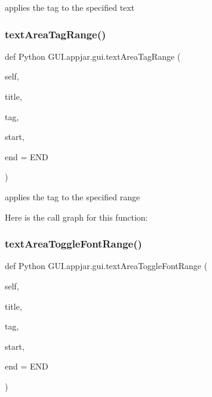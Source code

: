 \begin{DoxyVerb}
\begin{DoxyVerb}applies the tag to the specified text \end{DoxyVerb}
 \mbox{\label{class_python_01_g_u_i_1_1appjar_1_1gui_a6e203fa26a8192d057596db2f072f73c}} 
\subsubsection{\texorpdfstring{text\+Area\+Tag\+Range()}{textAreaTagRange()}}
{\footnotesize\ttfamily def Python G\+U\+I.\+appjar.\+gui.\+text\+Area\+Tag\+Range (\begin{DoxyParamCaption}\item[{}]{self,  }\item[{}]{title,  }\item[{}]{tag,  }\item[{}]{start,  }\item[{}]{end = {\ttfamily END} }\end{DoxyParamCaption})}

\begin{DoxyVerb}applies the tag to the specified range \end{DoxyVerb}
 Here is the call graph for this function\+:
\mbox{\label{class_python_01_g_u_i_1_1appjar_1_1gui_a317514b32a1a036b58b257c84b809bc0}} 
\subsubsection{\texorpdfstring{text\+Area\+Toggle\+Font\+Range()}{textAreaToggleFontRange()}}
{\footnotesize\ttfamily def Python G\+U\+I.\+appjar.\+gui.\+text\+Area\+Toggle\+Font\+Range (\begin{DoxyParamCaption}\item[{}]{self,  }\item[{}]{title,  }\item[{}]{tag,  }\item[{}]{start,  }\item[{}]{end = {\ttfamily END} }\end{DoxyParamCaption})}


\end{DoxyVerb}
